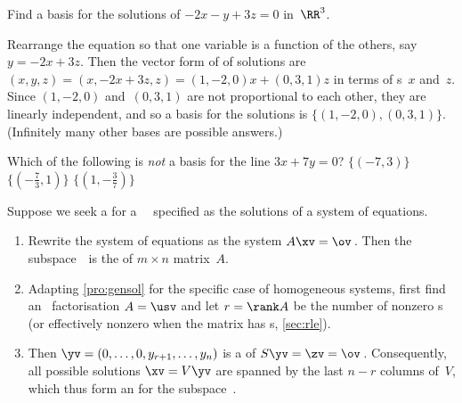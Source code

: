 \begin{example} \label{eg:}
Find a basis for the solutions of \(-2x-y+3z=0\) in~\(\RR^3\).
\begin{solution} 
Rearrange the equation so that one variable is a function of the others, say \(y=-2x+3z\).
Then the vector form of of solutions are \((x,y,z)=(x,-2x+3z,z)=(1,-2,0)x+(0,3,1)z\) in terms of s~\(x\) and~\(z\).
Since \((1,-2,0)\) and~\((0,3,1)\) are not proportional to each other, they are linearly independent, and so a basis for the solutions is \(\{(1,-2,0),(0,3,1)\}\).
(Infinitely many other bases are possible answers.)
\end{solution}
\end{example}



\begin{activity}
Which of the following is \emph{not} a basis for the line \(3x+7y=0\)?
{\(\{(-7,3)\}\)}
{\(\{(-\frac73,1)\}\)}
{\(\{(1,-\frac37)\}\)}
\end{activity}





\begin{procedure} \label{pro:bfe}
Suppose we seek a  for a ~\WW\ specified as the solutions of a system of equations.
\begin{enumerate}
\item Rewrite the system of equations as the  system \(A\xv=\ov\)\,. 
Then the subspace~\WW\ is the  of \(m\times n\) matrix~\(A\).
\item  Adapting \autoref{pro:gensol} for the specific case of homogeneous systems, first find an \svd\ factorisation \(A=\usv\) and let \(r=\rank A\) be the number of nonzero s (or effectively nonzero when the matrix has s, \autoref{sec:rle}).
\item Then \(\yv=(0,\ldots,0,y_{r+1},\ldots,y_n)\) is a  of \(S\yv=\zv=\ov\)\,.
Consequently, all possible solutions \(\xv=V\yv\) are spanned by the last \(n-r\) columns of~\(V\), which thus form an  for the subspace~\WW.
\end{enumerate}
\end{procedure}


